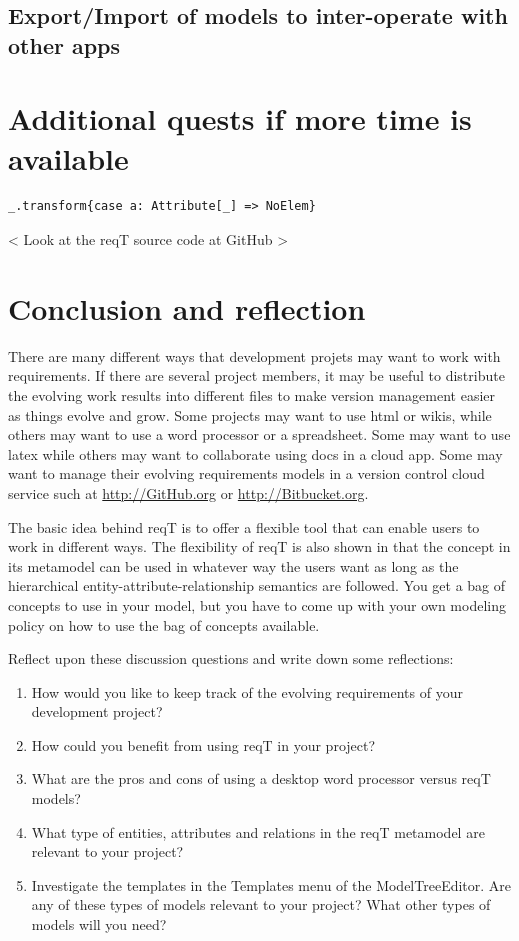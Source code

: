 \documentclass[11pt]{article}
\begin{document}
\subsection{Export/Import of models to inter-operate with other apps}

\section{Additional quests if more time is available}

{\footnotesize\begin{verbatim}
_.transform{case a: Attribute[_] => NoElem}
\end{verbatim}}

< Look at the reqT source code at GitHub >
\section{Conclusion and reflection}

There are many different ways that development projets may want to work with requirements. If there are several project members, it may be useful to distribute the evolving work results into different files to make version management easier as things evolve and grow. Some projects may want to use html or wikis, while others may want to use a word processor or a spreadsheet. Some may want to use latex while others may want to collaborate using docs in a cloud app. Some may want to manage their evolving requirements models in a version control cloud service such at \url{http://GitHub.org} or \url{http://Bitbucket.org}. 

The basic idea behind reqT is to offer a flexible tool that can enable users to work in different ways. The flexibility of reqT is also shown in that the concept in its metamodel can be used in whatever way the users want as long as the hierarchical entity-attribute-relationship semantics are followed. You get a bag of concepts to use in your model, but you have to come up with your own modeling policy on how to use the bag of concepts available.

\begin{framed}
Reflect upon these discussion questions and write down some reflections:
\begin{enumerate}
\item How would you like to keep track of the evolving requirements of your development project?
\item How could you benefit from using reqT in your project?
\item What are the pros and cons of using a desktop word processor versus reqT models? 
\item What type of entities, attributes and relations in the reqT metamodel are relevant to your project?
\item Investigate the templates in the Templates menu of the ModelTreeEditor. Are any of these types of models relevant to your project? What other types of models will you need?
\end{enumerate}
\end{framed}
\end{document}
